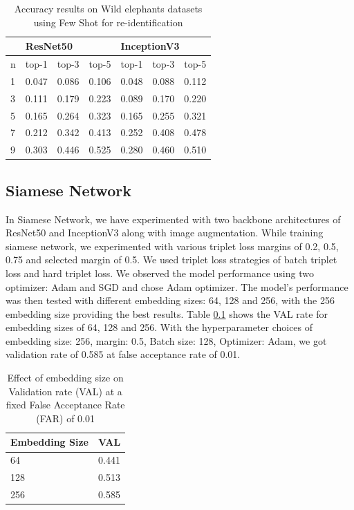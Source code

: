 \documentclass[10pt,twocolumn,letterpaper]{article}
\begin{document}
\begin{table}[]
\begin{tabular}{@{}lllllll@{}}
\toprule
                       & \multicolumn{3}{l}{ResNet50}               & \multicolumn{3}{l}{InceptionV3} \\ \midrule
\multicolumn{1}{l|}{n} & top-1 & top-3 & \multicolumn{1}{l|}{top-5} & top-1     & top-3    & top-5    \\ \midrule
\multicolumn{1}{l|}{1} & 0.047 & 0.086 & \multicolumn{1}{l|}{0.106} & 0.048     & 0.088    & 0.112    \\
\multicolumn{1}{l|}{3} & 0.111 & 0.179 & \multicolumn{1}{l|}{0.223} & 0.089     & 0.170    & 0.220    \\
\multicolumn{1}{l|}{5} & 0.165 & 0.264 & \multicolumn{1}{l|}{0.323} & 0.165     & 0.255    & 0.321    \\
\multicolumn{1}{l|}{7} & 0.212 & 0.342 & \multicolumn{1}{l|}{0.413} & 0.252     & 0.408    & 0.478    \\
\multicolumn{1}{l|}{9} & 0.303 & 0.446 & \multicolumn{1}{l|}{0.525} & 0.280     & 0.460    & 0.510   
\end{tabular}
\caption{Accuracy results on Wild elephants datasets using Few Shot for re-identification}
\label{tab:few-shot-results-wild}
\end{table}


\subsection{Siamese Network}

In Siamese Network, we have  experimented with two backbone architectures of ResNet50 and InceptionV3 along with image augmentation. While training siamese network, we experimented with various triplet loss margins of 0.2, 0.5, 0.75 and selected margin of 0.5. We used triplet loss strategies of batch triplet loss and hard triplet loss. We observed the model performance using two optimizer: Adam and SGD and chose Adam optimizer. The model's performance was then tested with different embedding sizes: 64, 128 and 256, with the 256 embedding size providing the best results. Table \ref{} shows the VAL rate for embedding sizes of 64, 128 and 256. With the hyperparameter choices of embedding size: 256, margin: 0.5, Batch size: 128, Optimizer: Adam, we got validation rate of 0.585 at false acceptance rate of 0.01. 



\begin{table}[]
\begin{tabular}{@{}l|l@{}}
Embedding Size & VAL   \\ \midrule
64             & 0.441 \\
128            & 0.513 \\
256            & 0.585
\end{tabular}
\caption{Effect of embedding size on Validation rate (VAL) at a fixed False Acceptance Rate (FAR) of 0.01}
\label{tab:embedding-size-val}
\end{table}
\end{document}
